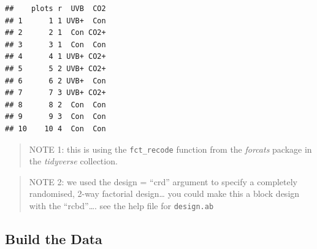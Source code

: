 \documentclass[
]{book}
\begin{document}
\begin{verbatim}
##    plots r  UVB  CO2
## 1      1 1 UVB+  Con
## 2      2 1  Con CO2+
## 3      3 1  Con  Con
## 4      4 1 UVB+ CO2+
## 5      5 2 UVB+ CO2+
## 6      6 2 UVB+  Con
## 7      7 3 UVB+ CO2+
## 8      8 2  Con  Con
## 9      9 3  Con  Con
## 10    10 4  Con  Con
\end{verbatim}

\begin{quote}
NOTE 1: this is using the \texttt{fct\_recode} function from the \emph{forcats} package in the \emph{tidyverse} collection.
\end{quote}

\begin{quote}
NOTE 2: we used the design = ``crd'' argument to specify a completely randomised, 2-way factorial design\ldots{} you could make this a block design with the ``rcbd''\ldots. see the help file for \texttt{design.ab}
\end{quote}

\hypertarget{build-the-data}{%
\subsection{Build the Data}\label{build-the-data}}
\end{document}
